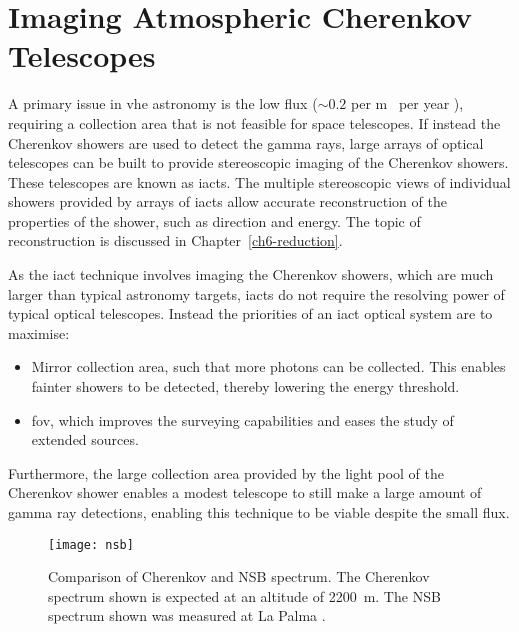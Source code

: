 \section{Imaging Atmospheric Cherenkov Telescopes}

A primary issue in \gls{vhe} astronomy is the low flux (${\sim} 0.2$ per \si{m \squared} per year \cite{Franco2016}), requiring a collection area that is not feasible for space telescopes. If instead the Cherenkov showers are used to detect the gamma rays, large arrays of optical telescopes can be built to provide stereoscopic imaging of the Cherenkov showers. These telescopes are known as \glspl{iact}. The multiple stereoscopic views of individual showers provided by arrays of \glspl{iact} allow accurate reconstruction of the properties of the shower, such as direction and energy. The topic of reconstruction is discussed in Chapter~\ref{ch6-reduction}.

As the \gls{iact} technique involves imaging the Cherenkov showers, which are much larger than typical astronomy targets, \glspl{iact} do not require the resolving power of typical optical telescopes. Instead the priorities of an \gls{iact} optical system are to maximise: 
\begin{itemize}
\item Mirror collection area, such that more photons can be collected. This enables fainter showers to be detected, thereby lowering the energy threshold.
\item \gls{fov}, which improves the surveying capabilities and eases the study of extended sources.
\end{itemize}
Furthermore, the large collection area provided by the light pool of the Cherenkov shower enables a modest telescope to still make a large amount of gamma ray detections, enabling this technique to be viable despite the small flux.

\begin{figure}
	\centering\texttt{[image: nsb]} 
	\caption[Comparison of Cherenkov and NSB spectrum.]{Comparison of Cherenkov and NSB spectrum. The Cherenkov spectrum shown is expected at an altitude of \SI{2200}{m}. The NSB spectrum shown was measured at La Palma \cite{Bouvier2013}.}
	\label{fig:nsb}
\end{figure}

